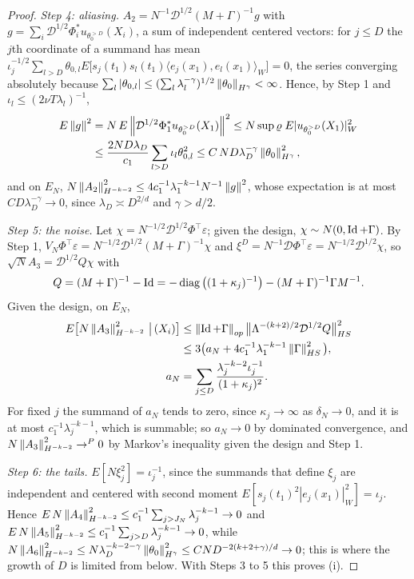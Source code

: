 \begin{proof}
\emph{Step 4: aliasing.} $A_2=N^{-1}\mathcal D^{1/2}(M+\Gamma)^{-1}g$ with $g=\sum_i\mathcal D^{1/2}\Phi_i^*u_{\theta_0^{>D}}(X_i)$, a sum of independent centered vectors: for $j\le D$ the $j$th coordinate of a summand has mean $\iota_j^{-1/2}\sum_{l>D}\theta_{0,l}E\big[s_j(t_1)s_l(t_1)\langle e_j(x_1),e_l(x_1)\rangle_W\big]=0$, the series converging absolutely because $\sum_l|\theta_{0,l}|\le(\sum_l\lambda_l^{-\gamma})^{1/2}\left\|\theta_0\right\|_{H^\gamma}<\infty$. Hence, by Step 1 and $\iota_l\le(2\nu T\lambda_l)^{-1}$,
\[
\begin{aligned}
E\left\|g\right\|^2&=N\,E\left\|\mathcal D^{1/2}\Phi_1^*u_{\theta_0^{>D}}(X_1)\right\|^2\le N\sup\varrho\;E|u_{\theta_0^{>D}}(X_1)|_W^2\\
&\le\frac{2ND\lambda_D}{c_1}\sum_{l>D}\iota_l\theta_{0,l}^2\le C\,ND\lambda_D^{-\gamma}\left\|\theta_0\right\|^2_{H^\gamma},
\end{aligned}
\]
and on $E_N$, $N\left\|A_2\right\|^2_{H^{-k-2}}\le4c_1^{-1}\lambda_1^{-k-1}N^{-1}\left\|g\right\|^2$, whose expectation is at most $CD\lambda_D^{-\gamma}\to0$, since $\lambda_D\asymp D^{2/d}$ and $\gamma>d/2$.

\emph{Step 5: the noise.} Let $\chi=N^{-1/2}\mathcal D^{1/2}\Phi^\top\varepsilon$; given the design, $\chi\sim N(0,\operatorname{Id}+\Gamma)$. By Step 1, $V_N\Phi^\top\varepsilon=N^{-1/2}\mathcal D^{1/2}(M+\Gamma)^{-1}\chi$ and $\xi^D=N^{-1}\mathcal D\Phi^\top\varepsilon=N^{-1/2}\mathcal D^{1/2}\chi$, so $\sqrt NA_3=\mathcal D^{1/2}Q\chi$ with
\[
Q=(M+\Gamma)^{-1}-\operatorname{Id}=-\operatorname{diag}\big((1+\kappa_j)^{-1}\big)-(M+\Gamma)^{-1}\Gamma M^{-1}.
\]
Given the design, on $E_N$,
\[
\begin{aligned}
E\big[N\left\|A_3\right\|^2_{H^{-k-2}}\,\big|\,(X_i)\big]&\le\left\|\operatorname{Id}+\Gamma\right\|_{op}\big\|\Lambda^{-(k+2)/2}\mathcal D^{1/2}Q\big\|^2_{HS}\\
&\le3\big(a_N+4c_1^{-1}\lambda_1^{-k-1}\left\|\Gamma\right\|^2_{HS}\big),\\
a_N&=\sum_{j\le D}\frac{\lambda_j^{-k-2}\iota_j^{-1}}{(1+\kappa_j)^2}.
\end{aligned}
\]
For fixed $j$ the summand of $a_N$ tends to zero, since $\kappa_j\to\infty$ as $\delta_N\to0$, and it is at most $c_1^{-1}\lambda_j^{-k-1}$, which is summable; so $a_N\to0$ by dominated convergence, and $N\left\|A_3\right\|^2_{H^{-k-2}}\to^P0$ by Markov's inequality given the design and Step 1.

\emph{Step 6: the tails.} $E[N\xi_j^2]=\iota_j^{-1}$, since the summands that define $\xi_j$ are independent and centered with second moment $E[s_j(t_1)^2|e_j(x_1)|_W^2]=\iota_j$. Hence $E\,N\left\|A_4\right\|^2_{H^{-k-2}}\le c_1^{-1}\sum_{j>J_N}\lambda_j^{-k-1}\to0$ and $E\,N\left\|A_5\right\|^2_{H^{-k-2}}\le c_1^{-1}\sum_{j>D}\lambda_j^{-k-1}\to0$, while $N\left\|A_6\right\|^2_{H^{-k-2}}\le N\lambda_D^{-k-2-\gamma}\left\|\theta_0\right\|^2_{H^\gamma}\le CND^{-2(k+2+\gamma)/d}\to0$; this is where the growth of $D$ is limited from below. With Steps 3 to 5 this proves (i).


\end{proof}
